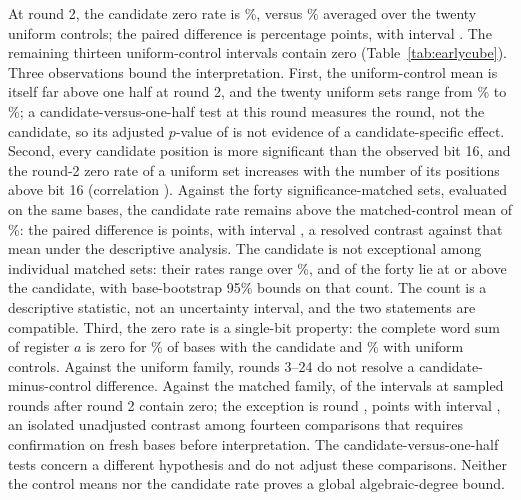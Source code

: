 \documentclass[11pt]{article}
\begin{document}
At round 2, the candidate zero rate is \EarlyCubeTarget\%, versus \EarlyCubeControl\% averaged over the twenty uniform controls; the paired difference is \EarlyCubeDifference{} percentage points, with interval \EarlyCubeCI{}. The remaining thirteen uniform-control intervals contain zero (Table~\ref{tab:earlycube}). Three observations bound the interpretation. First, the uniform-control mean is itself far above one half at round 2, and the twenty uniform sets range from \UniformCubeMinTwo\% to \UniformCubeMaxTwo\%; a candidate-versus-one-half test at this round measures the round, not the candidate, so its adjusted $p$-value of \EarlyCubeP{} is not evidence of a candidate-specific effect. Second, every candidate position is more significant than the observed bit 16, and the round-2 zero rate of a uniform set increases with the number of its positions above bit 16 (correlation \UniformCubeAboveCorr{}). Against the forty significance-matched sets, evaluated on the same bases, the candidate rate remains above the matched-control mean of \MatchedCubeMeanTwo\%: the paired difference is \MatchedCubeDiffTwo{} points, with interval \MatchedCubeCITwo{}, a resolved contrast against that mean under the descriptive analysis. The candidate is not exceptional among individual matched sets: their rates range over \MatchedCubeRangeTwo\%, and \MatchedCubeAtOrAboveTwo{} of the forty lie at or above the candidate, with base-bootstrap 95\% bounds \MatchedCubeRankCITwo{} on that count. The count is a descriptive statistic, not an uncertainty interval, and the two statements are compatible. Third, the zero rate is a single-bit property: the complete word sum of register $a$ is zero for \WholeWordATwo\% of bases with the candidate and \WholeWordAControlTwo\% with uniform controls. Against the uniform family, rounds 3--24 do not resolve a candidate-minus-control difference. Against the matched family, \MatchedCubeLaterZeroCount{} of the \MatchedCubeLaterCount{} intervals at sampled rounds after round 2 contain zero; the exception is round \MatchedCubeLaterExceptions{}, \MatchedCubeSevenDiff{} points with interval \MatchedCubeSevenCI{}, an isolated unadjusted contrast among fourteen comparisons that requires confirmation on fresh bases before interpretation. The candidate-versus-one-half tests concern a different hypothesis and do not adjust these comparisons. Neither the control means nor the candidate rate proves a global algebraic-degree bound.
\end{document}
